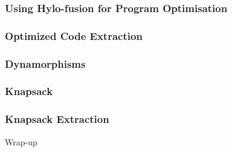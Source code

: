 \begin{frame}
  \frametitle{Using Hylo-fusion for Program Optimisation}
\end{frame}

\begin{frame}
  \frametitle{Optimized Code Extraction}
\end{frame}

\begin{frame}
  \frametitle{Dynamorphisms}
\end{frame}

\begin{frame}
  \frametitle{Knapsack}
\end{frame}

\begin{frame}
  \frametitle{Knapsack Extraction}
\end{frame}


\begin{frame}
  \vfill
  \centering
  \begin{sticky}
    {\normalfont Wrap-up}

    {\normalfont\Large \phantom{wrap-up}}
    \par%
  \end{sticky}
  \vfill
\end{frame}

\begin{frame}
  
\end{frame}
